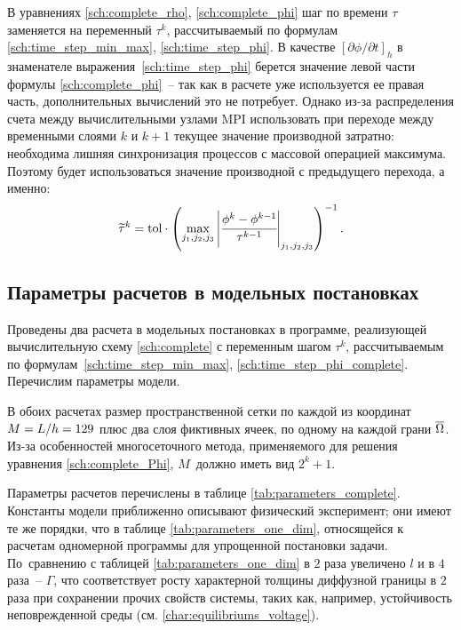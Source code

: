 В уравнениях \eqref{sch:complete_rho}, \eqref{sch:complete_phi} шаг по времени $\tau$ заменяется на переменный $\tau^k$, рассчитываемый по формулам \eqref{sch:time_step_min_max}, \eqref{sch:time_step_phi}. В качестве $[\partial \phi / \partial t]_h$ в знаменателе выражения~\eqref{sch:time_step_phi} берется значение левой части формулы \eqref{sch:complete_phi}~-- так как в расчете уже используется ее правая часть, дополнительных вычислений это не потребует. Однако из-за распределения счета между вычислительными узлами MPI использовать при переходе между временными слоями $k$ и $k + 1$ текущее значение производной затратно: необходима лишняя синхронизация процессов с массовой операцией максимума. Поэтому будет использоваться значение производной с предыдущего перехода, а именно:
\begin{equation}
    \widetilde{\tau}^k = {\text{tol}} \cdot \left( \max\limits_{j_1,j_2,j_3} \left| \cfrac{\phi^k - \phi^{k - 1}}{\tau^{k - 1}} \right|_{j_1,j_2,j_3} \right)^{-1}.
    \label{sch:time_step_phi_complete}
\end{equation}


\subsection{Параметры расчетов в модельных постановках}

Проведены два расчета в модельных постановках в программе, реализующей вычислительную схему \eqref{sch:complete} с переменным шагом $\tau^k$, рассчитываемым по формулам~\eqref{sch:time_step_min_max}, \eqref{sch:time_step_phi_complete}. Перечислим параметры модели.

В обоих расчетах размер пространственной сетки по каждой из координат $M \hm = L / h = 129$ плюс два слоя фиктивных ячеек, по одному на каждой грани ${\overline{\Omega}}$. Из-за особенностей многосеточного метода, применяемого для решения уравнения \eqref{sch:complete_Phi}, $M$~должно иметь вид $2^k + 1$.

Параметры расчетов перечислены в таблице \ref{tab:parameters_complete}. Константы модели приближенно описывают физический эксперимент; они имеют те же порядки, что в таблице \ref{tab:parameters_one_dim}, относящейся к расчетам одномерной программы для упрощенной постановки задачи. По~сравнению с таблицей \ref{tab:parameters_one_dim} в $2$ раза увеличено $l$ и в $4$ раза~-- $\Gamma$, что соответствует росту характерной толщины диффузной границы в $2$ раза при сохранении прочих свойств системы, таких как, например, устойчивость неповрежденной среды (см. \eqref{char:equilibriums_voltage}).

